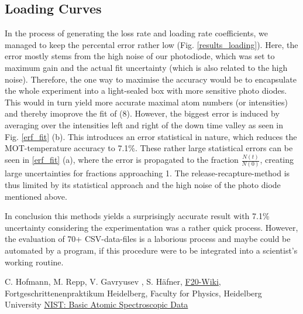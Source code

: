 \documentclass[12pt, a4paper]{article}
\begin{document}
\subsection{Loading Curves}
In the process of generating the loss rate and loading rate coefficients, we managed to keep the percental error rather low (Fig. \ref{results_loading}). Here, the error mostly stems from the high noise of our photodiode, which was set to maximum gain and the actual fit uncertainty (which is also related to the high noise). Therefore, the one way to maximise the accuracy would be to encapsulate the whole experiment into a light-sealed box with more sensitive photo diodes. This would in turn yield more accurate maximal atom numbers (or intensities) and thereby imoprove the fit of (8). However, the biggest error is induced by averaging over the intensities left and right of the down time valley as seen in Fig. \ref{erf_fit} (b). This introduces an error statistical in nature, which reduces the MOT-temperature accuracy to 7.1\%. These rather large statistical errors can be seen in \ref{erf_fit} (a), where the error is propagated to the fraction $\frac{N(t)}{N(0)}$, creating large uncertainties for fractions approaching 1. The release-recapture-method is thus limited by its statistical approach and the high noise of the photo diode mentioned above.

In conclusion this methods yields a surprisingly accurate result with 7.1\% uncertainty considering the experimentation was a rather quick process. However, the evaluation of 70+ CSV-data-files is a laborious process and maybe could be automated by a program, if this procedure were to be integrated into a scientist's working routine.


























\newpage 



\begin{thebibliography}{00}   %
 C. Hofmann, M. Repp, V. Gavryusev , S. H\"afner, \href{https://www.physi.uni-heidelberg.de/Forschung/QD/f20wikinew/index.php/Main_Page}{F20-Wiki}, Fortgeschrittenenpraktikum Heidelberg, Faculty for Physics, Heidelberg University
 \href{https://physics.nist.gov/PhysRefData/Handbook/Tables/rubidiumtable1.htm}{NIST: Basic Atomic Spectroscopic Data}

\end{thebibliography}
\end{document}
